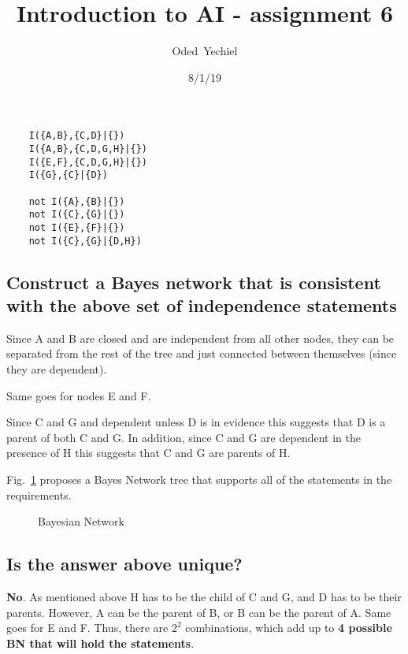 \documentclass{article}                     %
\newcommand{\relation}[3][]
{
	\path [draw=blue, ->,#1] (#2) -- (#3);
}
\newcommand{\mynode}[3][]{
	\node [draw, circle] (#1) at (#2, #3) {#1};
}
\begin{document}
	
	\title{Introduction to AI - assignment 6}
	
	
	\author{Oded~Yechiel}
	
	\date{8/1/19}
	
	\maketitle
	\tableofcontents
	\pagebreak
	\section{}
	\begin{verbatim}
	I({A,B},{C,D}|{})
	I({A,B},{C,D,G,H}|{})
	I({E,F},{C,D,G,H}|{})
	I({G},{C}|{D})
	
	not I({A},{B}|{})
	not I({C},{G}|{})
	not I({E},{F}|{})
	not I({C},{G}|{D,H})
	\end{verbatim}
	\subsection{Construct a Bayes network that is consistent with the  above set of independence statements}
	Since A and B are closed and are independent from all other nodes, they can be separated from the rest of the tree and just connected between themselves (since they are dependent). 
	
	Same goes for nodes E and F.
	
	Since C and G and dependent unless D is in evidence this suggests that D is a parent of both C and G. In addition, since C and G are dependent in the presence of H this suggests that C and G are parents of H.
	
	Fig.~\ref{fig:bn1} proposes a Bayes Network tree that supports all of the statements in the requirements.
	
	\begin{figure}
		\centering
		\caption{Bayesian Network}
		\label{fig:bn1}
	\end{figure}
	
	\subsection{Is the answer above unique?}
	\textbf{No}. As mentioned above H has to be the child of C and G, and D has to be their parents. However, A can be the parent of B, or B can be the parent of A. Same goes for E and F. Thus, there are $ 2^2 $ combinations, which add up to \textbf{4 possible BN that will hold the statements}.
	
\end{document}
